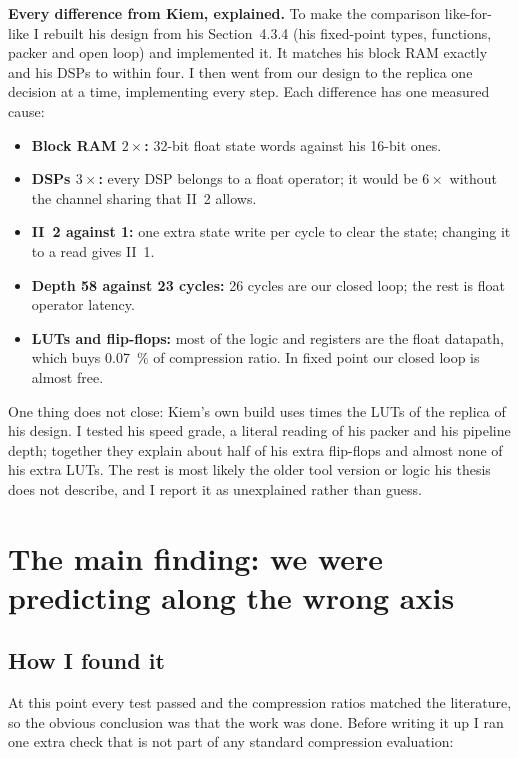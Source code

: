 \documentclass[11pt,a4paper]{article}
\begin{document}
\noindent
\textbf{Every difference from Kiem, explained.} To make the comparison
like-for-like I rebuilt his design from his Section~4.3.4 (his fixed-point
types, functions, packer and open loop) and implemented it. It matches his
block RAM exactly and his DSPs to within four. I then went from our design to
the replica one decision at a time, implementing every step. Each difference
has one measured cause:
\begin{itemize}
\item \textbf{Block RAM $2\times$:} 32-bit float state words against his 16-bit ones.
\item \textbf{DSPs $3\times$:} every DSP belongs to a float operator; it would be $6\times$ without the channel sharing that II~2 allows.
\item \textbf{II~2 against 1:} one extra state write per cycle to clear the state; changing it to a read gives II~1.
\item \textbf{Depth 58 against 23 cycles:} 26 cycles are our closed loop; the rest is float operator latency.
\item \textbf{LUTs and flip-flops:} most of the logic and registers are the float datapath, which buys \SI{0.07}{\percent} of compression ratio. In fixed point our closed loop is almost free.
\end{itemize}
One thing does not close: Kiem's own build uses  times the
LUTs of the replica of his design. I tested his speed grade, a literal reading
of his packer and his pipeline depth; together they explain about half of his
extra flip-flops and almost none of his extra LUTs. The rest is most likely the
older tool version or logic his thesis does not describe, and I report it as
unexplained rather than guess.

\section{The main finding: we were predicting along the wrong axis}
\label{sec:finding}

\subsection{How I found it}

At this point every test passed and the compression ratios matched the
literature, so the obvious conclusion was that the work was done. Before
writing it up I ran one extra check that is not part of any standard
compression evaluation:
\end{document}
